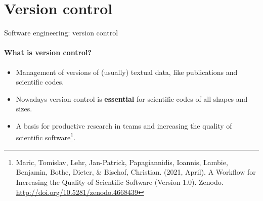 \section{Version control}

\begin{frame}{Software engineering: version control}
    \framesubtitle{What is version control?}

    \vfill
    \begin{itemize}
        \item Management of versions of (usually) textual data, like publications and scientific codes.
        \item Nowadays version control is \textbf{essential} for scientific codes of all shapes and sizes.
        \item A basis for productive research in teams and increasing the quality of scientific software\footnote{Maric, Tomislav, Lehr, Jan-Patrick, Papagiannidis, Ioannis, Lambie, Benjamin, Bothe, Dieter, \& Bischof, Christian. (2021, April). A Workflow for Increasing the Quality of Scientific Software (Version 1.0). Zenodo. \url{http://doi.org/10.5281/zenodo.4668439}}. 
    \end{itemize}


\end{frame}

